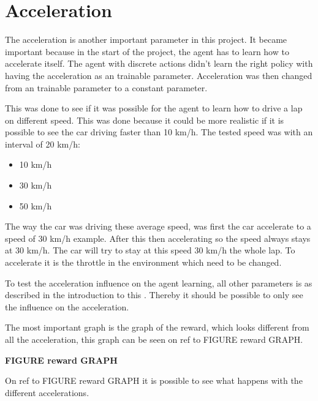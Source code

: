 \section{Acceleration}
The acceleration is another important parameter in this project. It became important because in the start of the project, the agent has to learn how to accelerate itself. The agent with discrete actions didn't learn the right policy with having the acceleration as an trainable parameter. Acceleration was then changed from an trainable parameter to a constant parameter.

This was done to see if it was possible for the agent to learn how to drive a lap on different speed. This was done because it could be more realistic if it is possible to see the car driving faster than 10 km/h. The tested speed was with an interval of 20 km/h:
\begin{itemize}
	\item 10 km/h
	\item 30 km/h
	\item 50 km/h
\end{itemize} 

The way the car was driving these average speed, was first the car accelerate to a speed of 30 km/h example. After this then accelerating so the speed always stays at 30 km/h. The car will try to stay at this speed 30 km/h the whole lap. To accelerate it is the throttle in the environment which need to be changed.

To test the acceleration influence on the agent learning, all other parameters is as described in the introduction to this . Thereby it should be possible to only see the influence on the acceleration.

The most important graph is the graph of the reward, which looks different from all the acceleration, this graph can be seen on {ref to FIGURE reward GRAPH}.


\textbf{FIGURE reward GRAPH}  


On {ref to FIGURE reward GRAPH} it is possible to see what happens with the different accelerations.   
 

  